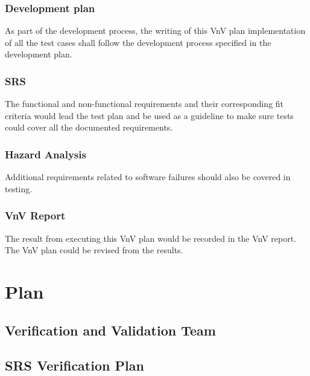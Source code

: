 \documentclass[12pt, titlepage]{article}
\begin{document}
\subsubsection{Development plan}
As part of the development process, the writing of this VnV plan implementation of all the test cases shall follow the development process specified in the development plan.

\subsubsection{SRS}
The functional and non-functional requirements and their corresponding fit criteria would lead the test plan and be used as a guideline to make sure tests could cover all the documented requirements.
\subsubsection{Hazard Analysis}
Additional requirements related to software failures should also be covered in testing.
\subsubsection{VnV Report}
The result from executing this VnV plan would be recorded in the VnV report.  The VnV plan could be revised from the results.
\section{Plan}


\subsection{Verification and Validation Team}


\subsection{SRS Verification Plan}

\end{document}
